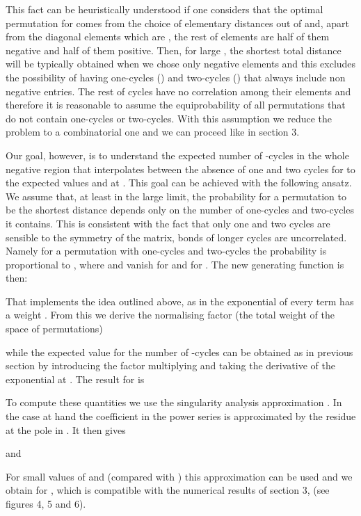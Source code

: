 \documentclass[]{iopart}
\begin{document}
This fact can be heuristically understood if one considers that 
the optimal permutation for  comes from the choice 
of  elementary distances  out of  and, apart from the 
diagonal elements which are , the rest of elements are half of them negative
and half of them positive.
Then, for large , the shortest total distance will be typically
obtained when we chose only negative elements and this excludes
the possibility of having one-cycles ()
and two-cycles () that always include 
non negative entries.
The rest of cycles have no correlation
among their elements and therefore it is
reasonable to assume the equiprobability of all
permutations that do not contain one-cycles or 
two-cycles. With this assumption we reduce the problem to a combinatorial
one and we can proceed like in section 3.

Our goal, however, is to understand the expected number of -cycles
in the whole negative region  that interpolates
between the absence of one and two cycles for  
to the expected values  and  at .
This goal can be achieved with the following ansatz.
We assume that, at least in the large  limit, the probability for a 
permutation to be the 
shortest distance depends only on the number of one-cycles and 
two-cycles it contains.
This is consistent with the fact that only one and two cycles
are sensible to the symmetry of the matrix, bonds of longer
cycles are uncorrelated.
Namely for a permutation with  one-cycles and
 two-cycles the probability is proportional
to , where  and  vanish
for  and  for .
The new generating function is then:

That implements the idea outlined above, as in the exponential 
of  every term has a weight
.
{}From this we derive the normalising factor
(the total weight of the space of permutations)

while the expected value for the number of -cycles can be 
obtained as in previous section by introducing the factor 
multiplying  and taking the derivative of the exponential 
at .
The result for  is

To compute these quantities we use the singularity analysis
approximation \cite{Flajolet}. In the case at hand the  
coefficient in the power series is approximated by the residue at 
the pole in . It then gives

and 

For small values of  and  (compared with ) this approximation 
can be used and we obtain  for , which is compatible 
with the numerical results of section 3, (see figures 4, 5 and 6). 
\end{document}
